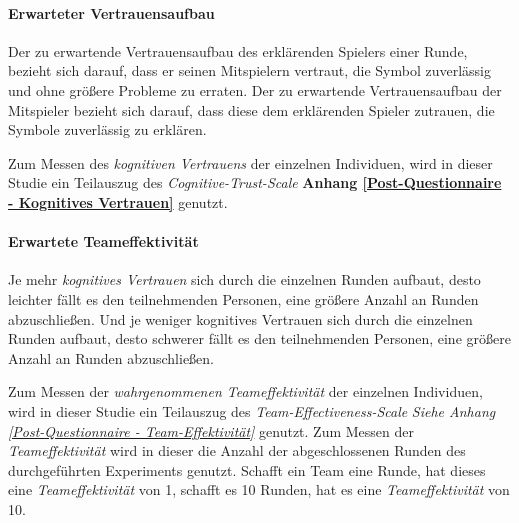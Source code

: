 \documentclass[a4paper,11pt]{article}%
\renewcommand{\\}{\vspace*{0.5\baselineskip} \newline}
\begin{document}
\paragraph{Erwarteter Vertrauensaufbau}
Der zu erwartende Vertrauensaufbau des erklärenden Spielers einer Runde, bezieht sich darauf, dass er seinen Mitspielern vertraut, die Symbol zuverlässig und ohne größere Probleme zu erraten. Der zu erwartende Vertrauensaufbau der Mitspieler bezieht sich darauf, dass diese dem erklärenden Spieler zutrauen, die Symbole zuverlässig zu erklären.

Zum Messen des \textit{kognitiven Vertrauens} der einzelnen Individuen, wird in dieser Studie ein Teilauszug des \textit{Cognitive-Trust-Scale} \citep[S.37]{mcallister1995affect} \textbf{Anhang \ref{Post-Questionnaire - Kognitives Vertrauen}} genutzt.

\paragraph{Erwartete Teameffektivität}
Je mehr \textit{kognitives Vertrauen} sich durch die einzelnen Runden aufbaut, desto leichter fällt es den teilnehmenden Personen, eine größere Anzahl an Runden abzuschließen. Und je weniger kognitives Vertrauen sich durch die einzelnen Runden aufbaut, desto schwerer fällt es den teilnehmenden Personen, eine größere Anzahl an Runden abzuschließen.

Zum Messen der \textit{wahrgenommenen Teameffektivität} der einzelnen Individuen, wird in dieser Studie ein Teilauszug des \textit{Team-Effectiveness-Scale} \textit{Siehe Anhang \ref{Post-Questionnaire - Team-Effektivität}} \citep[S.469]{gibson2003team} genutzt. 
Zum Messen der \textit{Teameffektivität} wird in dieser die Anzahl der abgeschlossenen Runden des durchgeführten Experiments genutzt. Schafft ein Team eine Runde, hat dieses eine \textit{Teameffektivität} von 1, schafft es 10 Runden, hat es eine \textit{Teameffektivität} von 10.

\newpage
\end{document}
